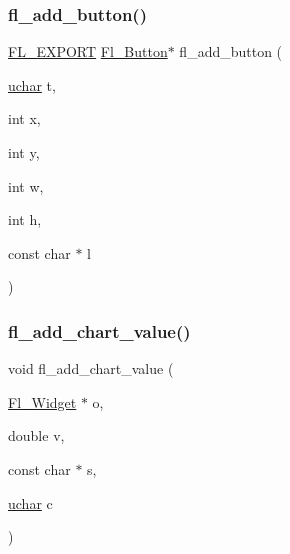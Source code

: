 \subsubsection{\texorpdfstring{fl\+\_\+add\+\_\+button()}{fl\_add\_button()}}
{\footnotesize\ttfamily \hyperlink{_fl___export_8_h_aa9ba29a18aee9d738370a06eeb4470fc}{F\+L\+\_\+\+E\+X\+P\+O\+RT} \hyperlink{class_fl___button}{Fl\+\_\+\+Button}$\ast$ fl\+\_\+add\+\_\+button (\begin{DoxyParamCaption}\item[{\hyperlink{fl__types_8h_a65f85814a8290f9797005d3b28e7e5fc}{uchar}}]{t,  }\item[{int}]{x,  }\item[{int}]{y,  }\item[{int}]{w,  }\item[{int}]{h,  }\item[{const char $\ast$}]{l }\end{DoxyParamCaption})}

\mbox{\label{forms_8_h_a37311073eaa0582679e5db508bf7c917}} 
\subsubsection{\texorpdfstring{fl\+\_\+add\+\_\+chart\+\_\+value()}{fl\_add\_chart\_value()}}
{\footnotesize\ttfamily void fl\+\_\+add\+\_\+chart\+\_\+value (\begin{DoxyParamCaption}\item[{\hyperlink{class_fl___widget}{Fl\+\_\+\+Widget} $\ast$}]{o,  }\item[{double}]{v,  }\item[{const char $\ast$}]{s,  }\item[{\hyperlink{fl__types_8h_a65f85814a8290f9797005d3b28e7e5fc}{uchar}}]{c }\end{DoxyParamCaption})\hspace{0.3cm}{\ttfamily [inline]}}

\mbox{\label{forms_8_h_ae23179107c7fe06cec999dfd544d6734}} 
